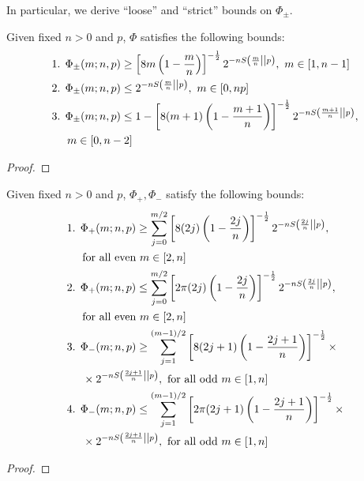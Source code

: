 In particular, we derive ``loose'' and ``strict'' bounds on $\Phi_{\pm}$.
\begin{lemma}\label{lem:bounds_loose}
	Given fixed $n>0$ and $p$, $\Phi$ satisfies the following bounds:
	\begin{align*}
		\begin{split}
		&\text{1. } \Phi_{\pm}(m; n, p) \geq \left[ 8m\left(1-\frac{m}{n}\right) \right]^{-\frac{1}{2}} 2^{-n{S\left( \frac{m}{n} \middle\vert\middle\vert p \right)}},\ m\in [1,n-1] \\
		&\text{2. } \Phi_{\pm}(m; n, p) \leq 2^{-n{S\left( \frac{m}{n} \middle\vert\middle\vert p \right)}},\ m\in [0,np] \\
		&\text{3. } \Phi_{\pm}(m; n, p) \leq 1 - \left[ 8(m+1)\left(1-\frac{m+1}{n}\right) \right]^{-\frac{1}{2}} 2^{-nS\left( \frac{m+1}{n} \middle\vert\middle\vert p \right)}, \\
		&\hspace{14pt} m\in [0,n-2]
		\end{split}
	\end{align*}
\end{lemma}
\begin{proof}
\end{proof}
\begin{lemma}\label{lem:bounds_strict}
	Given fixed $n>0$ and $p$, $\Phi_+, \Phi_-$ satisfy the following bounds:
	\begin{align*}
		\begin{split}
		&\text{1. } \Phi_+(m; n, p) \geq \sum\limits_{j=0}^{m/2}\left[ 8(2j)\left(1-\frac{2j}{n}\right) \right]^{-\frac{1}{2}} 2^{-n\ent{\frac{2j}{n}}{p}}, \\
		&\hspace{14pt} \text{for all even } m\in [2,n] \\
		&\text{2. } \Phi_+(m; n, p) \leq \sum\limits_{j=0}^{m/2}\left[ 2\pi(2j)\left(1-\frac{2j}{n}\right) \right]^{-\frac{1}{2}} 2^{-n\ent{\frac{2j}{n}}{p}}, \\
		&\hspace{14pt} \text{for all even } m\in [2,n] \\
		&\text{3. } \Phi_-(m; n, p) \geq \sum\limits_{j=1}^{(m-1)/2}\left[ 8(2j+1)\left(1-\frac{2j+1}{n}\right) \right]^{-\frac{1}{2}} \times \\
		&\hspace{14pt} \times 2^{-n\ent{\frac{2j+1}{n}}{p}},\ \text{for all odd } m\in [1,n] \\
		&\text{4. } \Phi_-(m; n, p) \leq \sum\limits_{j=1}^{(m-1)/2}\left[ 2\pi(2j+1)\left(1-\frac{2j+1}{n}\right) \right]^{-\frac{1}{2}} \times \\
		&\hspace{14pt} \times 2^{-n\ent{\frac{2j+1}{n}}{p}},\ \text{for all odd } m\in [1,n]
		\end{split}
	\end{align*}
\end{lemma}
\begin{proof}
\end{proof}
\fi


